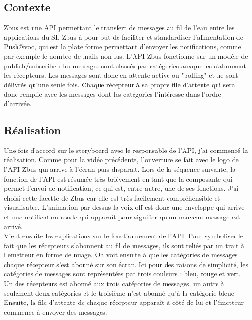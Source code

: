 \subsection{Contexte}
Zbus est une API permettant le transfert de messages au fil de l'eau entre les applications du SI. Zbus à pour but de faciliter et standardiser l'alimentation de Push@voo, qui est la plate forme permettant d'envoyer les notifications,  comme par exemple le nombre de mails non lus. L'API Zbus fonctionne sur un modèle de publish/subscribe : les messages sont classés par catégories auxquelles s'abonnent les récepteurs. Les messages sont donc en attente active ou "polling" et ne sont délivrés qu'une seule fois. Chaque récepteur à sa propre file d'attente qui sera donc remplie avec les messages dont les catégories l'intéresse dans l'ordre d'arrivée.  


\subsection{Réalisation}

Une fois d'accord sur le storyboard avec le responsable de l'API, j'ai commencé la réalisation. Comme pour la vidéo précédente, l'ouverture se fait avec le logo de l'API Zbus qui arrive à l'écran puis disparaît. Lors de la séquence suivante, la fonction de l'API est résumée très brièvement en tant que la composante qui permet l'envoi de notification, ce qui est, entre autre, une de ses fonctions. J'ai choisi cette facette de Zbus car elle est très facilement compréhensible et visualisable. L'animation par dessus la voix off est donc une enveloppe qui arrive et une notification ronde qui apparaît pour signifier qu'un nouveau message est arrivé.\\

Vient ensuite les explications sur le fonctionnement de l'API. Pour symboliser le fait que les récepteurs s'abonnent au fil de messages, ils sont reliés par un trait à l'émetteur en forme de nuage. On voit ensuite à quelles catégories de messages chaque récepteur s'est abonné sur son écran. Ici pour des raisons de simplicité, les catégories de messages sont représentées par trois couleurs : bleu, rouge et vert. Un des récepteurs est abonné aux trois catégories de messages, un autre à seulement deux catégories et le troisième n'est abonné qu'à la catégorie bleue. Ensuite, la file d'attente de chaque récepteur apparaît à côté de lui et l'émetteur commence à envoyer des messages. 


